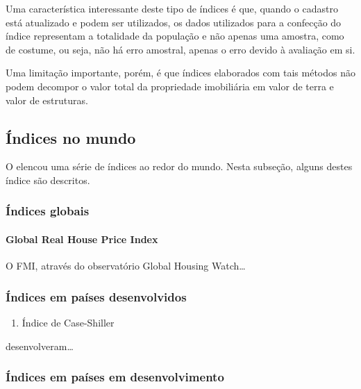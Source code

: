 \documentclass[
	12pt,				%
	oneside,			%
	a4paper,			%
	chapter=TITLE,		%
	section=TITLE,		%
	english,			%
	brazil				%
	]{abntex2}
\begin{document}
Uma característica interessante deste tipo de índices é que, quando o cadastro
está atualizado e podem ser utilizados, os dados utilizados para a confecção do
índice representam a totalidade da população e não apenas uma amostra, como de
costume, ou seja, não há erro amostral, apenas o erro devido à avaliação em si.

Uma limitação importante, porém, é que índices elaborados com tais métodos não
podem decompor o valor total da propriedade imobiliária em valor de terra e
valor de estruturas.

\hypertarget{uxedndices-no-mundo}{%
\subsection{Índices no mundo}\label{uxedndices-no-mundo}}

O \textcite{rppi} elencou uma série de índices ao redor do mundo. Nesta subseção, alguns destes índice são descritos.

\hypertarget{uxedndices-globais}{%
\subsubsection{Índices globais}\label{uxedndices-globais}}

\hypertarget{global-real-house-price-index}{%
\paragraph{Global Real House Price Index}\label{global-real-house-price-index}}

O FMI, através do observatório Global Housing Watch\ldots{}

\hypertarget{uxedndices-em-pauxedses-desenvolvidos}{%
\subsubsection{Índices em países desenvolvidos}\label{uxedndices-em-pauxedses-desenvolvidos}}
\begin{enumerate}
\def\labelenumi{\alph{enumi}.}
\tightlist
\item
  Índice de Case-Shiller
\end{enumerate}
\textcite{NBERw2506} desenvolveram\ldots{}

\hypertarget{uxedndices-em-pauxedses-em-desenvolvimento}{%
\subsubsection{Índices em países em desenvolvimento}\label{uxedndices-em-pauxedses-em-desenvolvimento}}
\end{document}
